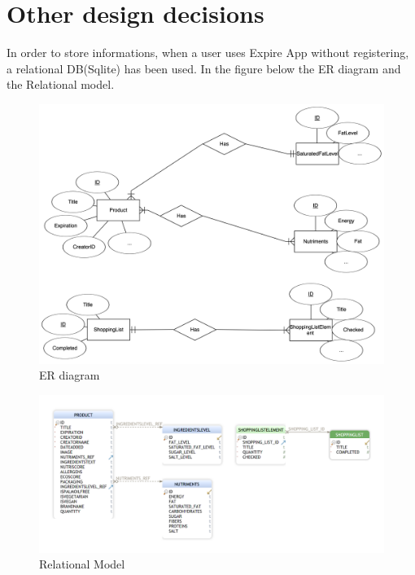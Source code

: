 \section{Other design decisions}
In order to store informations, when a user uses Expire App without registering, a relational DB(Sqlite) has been used.
In the figure below the ER diagram and the Relational model.

\begin{figure}[H]
  \includegraphics[width=\textwidth,height=\textheight,keepaspectratio]{./Images/ermodel.png}
  \caption{ER diagram}
\end{figure}



\begin{figure}[H]
  \includegraphics[width=\textwidth,height=\textheight,keepaspectratio]{./Images/Relational_model.png}
  \caption{Relational Model}
\end{figure}


